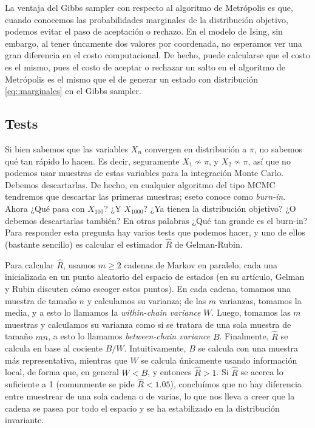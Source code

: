 \documentclass[a4paper, 12pt]{article}
\begin{document}
La ventaja del Gibbs sampler con respecto al algoritmo de Metrópolis es que, cuando conocemos las probabilidades marginales de la distribución objetivo, podemos evitar el paso de aceptación o rechazo. En el modelo de Ising, sin embargo, al tener úncamente dos valores por coordenada, no esperamos ver una gran diferencia en el costo computacional. De hecho, puede calcularse que el costo es el mismo, pues el costo de aceptar o rechazar un salto en el algoritmo de Metrópolis es el mismo que el de generar un estado con distribución \eqref{eq::marginales} en el Gibbs sampler. 

\subsection{Tests}

Si bien sabemos que las variables $X_n$ convergen en distribución a $\pi$, no sabemos qué tan rápido lo hacen. Es decir, seguramente $X_1 \not \sim \pi$, y $X_2 \not \sim \pi$, así que no podemos usar muestras de estas variables para la integración Monte Carlo. Debemos descartarlas. De hecho, en cualquier algoritmo del tipo MCMC tendremos que descartar las primeras muestras; eseto conoce como {\it burn-in}. Ahora ¿Qué pasa con $X_{100}$? ¿Y $X_{1000}$? ¿Ya tienen la distribución objetivo? ¿O debemos descartarlas también? En otras palabras ¿Qué tan grande es el burn-in? Para responder esta pregunta hay varios tests que podemos hacer, y uno de ellos (bastante sencillo) es calcular el estimador $\hat{R}$ de Gelman-Rubin.

Para calcular $\hat{R}$, usamos $m \geq 2$ cadenas de Markov en paralelo, cada una inicializada en un punto aleatorio del espacio de estados (en su artículo, Gelman y Rubin discuten cómo escoger estos puntos). En cada cadena, tomamos una muestra de tamaño $n$ y calculamos su varianza; de las $m$ varianzas, tomamos la media, y a esto lo llamamos la {\it within-chain variance} $W$. Luego, tomamos las $m$ muestras y calculamos su varianza como si se tratara de una sola muestra de tamaño $mn$, a esto lo llamamos {\it between-chain variance} $B$. Finalmente, $\hat{R}$ se calcula en base al cociente $B / W$. Intuitivamente, $B$ se calcula con una muestra más representativa, mientras que $W$ se calcula únicamente usando información local, de forma que, en general $W < B$, y entonces $\hat{R} > 1$. Si $\hat{R}$ se acerca lo suficiente a 1 (comunmente se pide $\hat{R} < 1.05$), concluímos que no hay diferencia entre muestrear de una sola cadena o de varias, lo que nos lleva a creer que la cadena se pasea por todo el espacio y se ha estabilizado en la distribución invariante.\\
\end{document}
